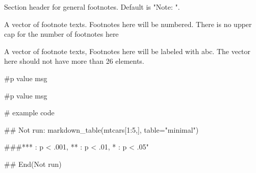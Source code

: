 \documentclass[a4paper]{book}
\begin{document}
\begin{Arguments}
\begin{ldescription}
\item[\code{general\_title}] Section header for general footnotes. Default is "Note: ".

\item[\code{number}] A vector of footnote texts. Footnotes here will be numbered. There is no upper cap for the number of footnotes here

\item[\code{alphabet}] A vector of footnote texts, Footnotes here will be labeled with abc. The vector here should not have more than 26 elements.

\item[\code{catout}] \#p value msg

\item[\code{general}] \#p value msg
\end{ldescription}
\end{Arguments}
%
\begin{Examples}
\begin{ExampleCode}
# example code

  \#\# Not run: 
  markdown_table(mtcars[1:5,], table="minimal")

  ###*** : p < .001, ** : p < .01, * : p < .05"
  
## End(Not run)
\end{ExampleCode}
\end{Examples}
\end{document}
